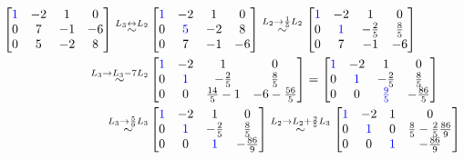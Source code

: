 \documentclass{article}
\begin{document}
\begin{align*}
    \begin{bmatrix}
    \color{blue}1 & -2 & 1 & 0\\
    0 & 7 & -1 & -6\\
    0 & 5 & -2 & 8
    \end{bmatrix}
    \overset{L_3 \leftrightarrow L_2}{\sim}
    &\begin{bmatrix}
    \color{blue}1 & -2 & 1 & 0\\
    0 & \color{blue}5 & -2 & 8\\
    0 & 7 & -1 & -6
    \end{bmatrix}
    \overset{L_2 \to \frac{1}{5}L_2}{\sim}
    \begin{bmatrix}
    \color{blue}1 & -2 & 1 & 0\\
    0 & \color{blue}1 & -\frac{2}{5} & \frac{8}{5}\\
    0 & 7 & -1 & -6
    \end{bmatrix}\\
    \overset{L_3 \to L_3 - 7L_2}{\sim}
    &\begin{bmatrix}
    \color{blue}1 & -2 & 1 & 0\\
    0 & \color{blue}1 & -\frac{2}{5} & \frac{8}{5}\\
    0 & 0 & \frac{14}{5}-1 & -6-\frac{56}{5}
    \end{bmatrix}
    =
    \begin{bmatrix}
    \color{blue}1 & -2 & 1 & 0\\
    0 & \color{blue}1 & -\frac{2}{5} & \frac{8}{5}\\
    0 & 0 & \color{blue}\frac{9}{5} & -\frac{86}{5}
    \end{bmatrix}\\
    \overset{L_3 \to \frac{5}{9}L_3}{\sim}
    &\begin{bmatrix}
    \color{blue}1 & -2 & 1 & 0\\
    0 & \color{blue}1 & -\frac{2}{5} & \frac{8}{5}\\
    0 & 0 & \color{blue}1 & -\frac{86}{9}
    \end{bmatrix}
    \overset{L_2 \to L_2 + \frac{2}{5}L_3}{\sim}
    \begin{bmatrix}
    \color{blue}1 & -2 & 1 & 0\\
    0 & \color{blue}1 & 0 & \frac{8}{5} - \frac{2}{5}\frac{86}{9}\\
    0 & 0 & \color{blue}1 & -\frac{86}{9}
    \end{bmatrix}\\

\end{align*}
\end{document}
